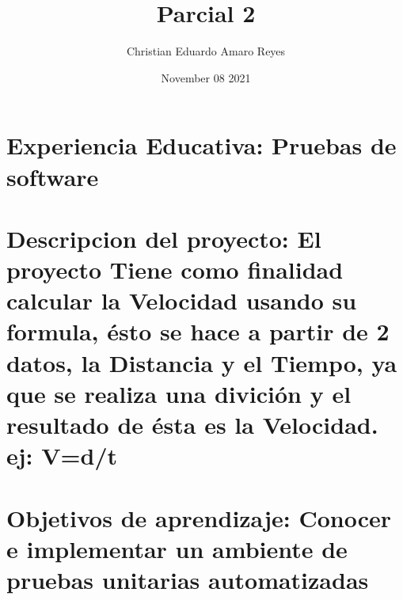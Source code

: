 \documentclass{article}
\title{Parcial 2}
\author{Christian Eduardo Amaro Reyes }
\date{November 08 2021}
\begin{document}
\maketitle

\section{Experiencia Educativa: Pruebas de software}
\section{Descripcion del proyecto: El proyecto Tiene como finalidad calcular la Velocidad usando su formula, ésto se hace a partir de 2 datos, la Distancia y el Tiempo, ya que se realiza una divición y el resultado de ésta es la Velocidad.  ej: V=d/t}
\section{Objetivos de aprendizaje: Conocer e implementar un ambiente de pruebas unitarias automatizadas}
\end{document}
